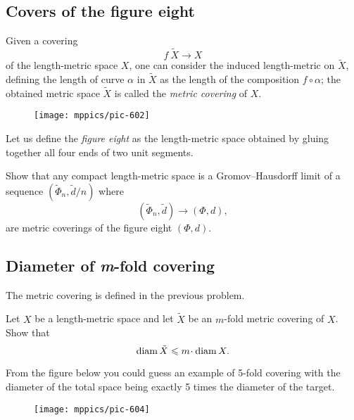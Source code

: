 

\subsection*{Covers of the figure eight}\label{figure-eight-1}

Given a covering 
\[f\:\tilde X \to X\]
of the length-metric space $X$,
one can consider the induced length-metric on $\tilde X$,
defining the length of curve $\alpha$ in $\tilde X$ as the length of the composition $f\circ\alpha$; the obtained metric space $\tilde X$ is called the  \emph{metric covering} of $X$.

{

\begin{wrapfigure}{o}{23 mm}
\vskip-4mm
\centering
\texttt{[image: mppics/pic-602]}
\end{wrapfigure}

Let us define the \emph{figure eight} as the length-metric space obtained by gluing together all four ends of two unit segments.

}

\begin{pr}
Show that any compact length-metric space 
is a Gromov--Hausdorff limit of a sequence $(\widetilde \Phi_n, \tilde d/n)$
where 
\[(\widetilde \Phi_n, \tilde d)\to(\Phi,d),\]
are metric coverings of the figure eight $(\Phi,d)$.
\end{pr}


\subsection*{Diameter of \textit{m}-fold covering\hard}\label{m-fold-cover}

The metric covering is defined in the previous problem.

\begin{pr}
Let $X$ be a length-metric space
and let $\tilde X$ be an $m$-fold metric covering of $X$.
Show that
$$\diam\tilde X\le m\cdot \diam X.$$
\end{pr}

From the figure below you could guess an example of 5-fold covering with the diameter of the total space being exactly 5 times the diameter of the target.

\begin{figure}[h!]
\vskip0mm
\centering
\texttt{[image: mppics/pic-604]}
\end{figure}

